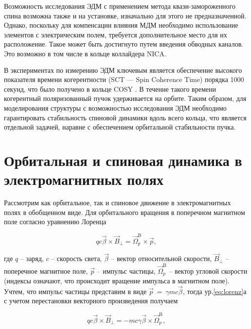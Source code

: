 \par Возможность исследования ЭДМ с применением метода квази-замороженного спина возможна также и на установке, изначально для этого не предназначенной. Однако, поскольку для компенсации влияния МДМ необходимо использование элементов с электрическим полем, требуется дополнительное место для их расположение. Такое может быть достигнуто путем введения обводных каналов. Это возможно в том числе в кольце коллайдера NICA.

\par В экспериментах по измерению ЭДМ ключевым является обеспечение высокого показателя времени когерентности (SCT — Spin Coherence Time) порядка 1000 секунд, что было получено в кольце COSY \cite{AGSproposal}. В течение такого времени когерентный поляризованный пучок удерживается на орбите. Таким образом, для моделирования структуры с возможностью исследования ЭДМ необходимо гарантировать стабильность спиновой динамики вдоль всего кольца, что является отдельной задачей, наравне с обеспечением орбитальной стабильности пучка.

\section{Орбитальная и спиновая динамика в электромагнитных полях}\label{sec:EDM/requirements/deflector}

\par Рассмотрим как орбитальное, так и спиновое движение в электромагнитных полях в обобщенном виде. Для орбитального вращения в поперечном магнитном поле согласно уравнению Лоренца

\begin{equation} 
qc\vec{\beta}\times{\vec{B}}_\bot={\vec{\Omega}}_p^{\textrm{B}}\times\vec{p},
\label{eq:lorenz}
\end{equation}

\noindent где $q$ -- заряд, $c$ -- скорость света, $\vec{\beta}$ -- вектор относительной скорости, ${\vec{B}}_\bot$ -- поперечное магнитное поле, $\vec{p}$ -- импульс частицы, ${\vec{\Omega}}_p^{\textrm{B}}$ -- вектор угловой скорости (индексы означают, что происходит вращение импульса в магнитном поле). Учтем, что импульс частицы представим в виде $\vec{p}\ =\ \gamma mc\vec{\beta}$, тогда ур.\ref{eq:lorenz}а с учетом перестановки векторного произведения получаем

\begin{equation}	
qc\vec{\beta}\times{\vec{B}}_\bot=-mc\gamma\vec{\beta}\times{\vec{\Omega}}_p^{\textrm{B}},
\end{equation}

